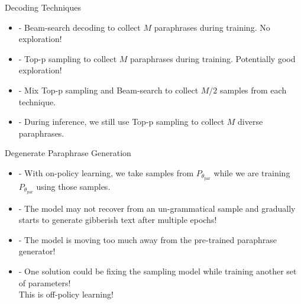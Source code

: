\documentclass{beamer}
\begin{document}
\begin{frame}{Decoding Techniques}
\begin{itemize}
        \item - Beam-search decoding to collect $M$ paraphrases during training. No exploration!
        \medskip
        \medskip
        \medskip
        \item - Top-p sampling to collect $M$ paraphrases during training. Potentially good exploration!
        \medskip
        \medskip
        \medskip
        \item - Mix Top-p sampling and Beam-search to collect $M/2$ samples from each technique.
        \medskip
        \medskip
        \medskip
        \item - During inference, we still use Top-p sampling to collect $M$ diverse paraphrases.
\end{itemize}
\end{frame}

\begin{frame}{Degenerate Paraphrase Generation}
\begin{itemize}
        \item - With on-policy learning, we take samples from $P_{\theta_{\text{par}}}$ while we are training $P_{\theta_{\text{par}}}$ using those samples.
        \medskip
        \medskip
        \medskip
        \item
        - The model may not recover from an un-grammatical sample and gradually starts to generate gibberish text after multiple epochs!
        \medskip
        \medskip
        \medskip
        \item - The model is moving too much away from the pre-trained paraphrase generator!
        \medskip
        \medskip
        \medskip
        \item - One solution could be fixing the sampling model while training another set of parameters!\\{\color{brown}This is off-policy learning!}
\end{itemize}
\end{frame}
\end{document}
